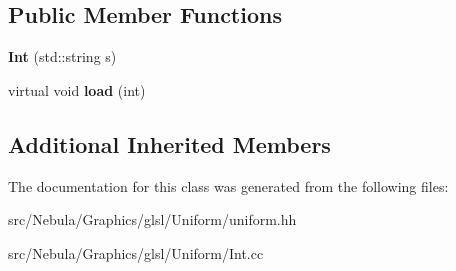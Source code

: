 \subsection*{Public Member Functions}
\begin{DoxyCompactItemize}
\item 
\hypertarget{classNeb_1_1glsl_1_1Uniform_1_1Scalar_1_1Int_afc2e77242ed6bbb588978085f515a7bf}{{\bfseries Int} (std\-::string s)}\label{classNeb_1_1glsl_1_1Uniform_1_1Scalar_1_1Int_afc2e77242ed6bbb588978085f515a7bf}

\item 
\hypertarget{classNeb_1_1glsl_1_1Uniform_1_1Scalar_1_1Int_a2d63b9bc35ba2d1773c9eb3429e00b3d}{virtual void {\bfseries load} (int)}\label{classNeb_1_1glsl_1_1Uniform_1_1Scalar_1_1Int_a2d63b9bc35ba2d1773c9eb3429e00b3d}

\end{DoxyCompactItemize}
\subsection*{Additional Inherited Members}


The documentation for this class was generated from the following files\-:\begin{DoxyCompactItemize}
\item 
src/\-Nebula/\-Graphics/glsl/\-Uniform/uniform.\-hh\item 
src/\-Nebula/\-Graphics/glsl/\-Uniform/Int.\-cc\end{DoxyCompactItemize}
